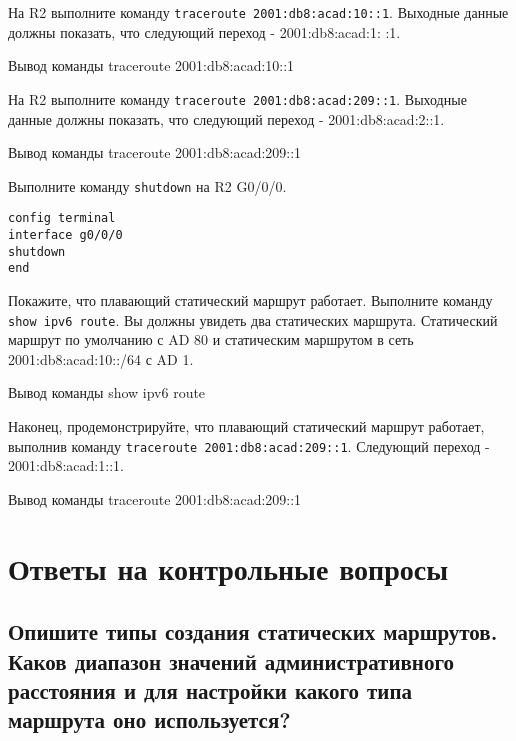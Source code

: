 На R2 выполните команду \texttt{traceroute 2001:db8:acad:10::1}.
Выходные данные должны показать, что следующий переход - 2001:db8:acad:1: :1.

\begin{image}
	\caption{Вывод команды traceroute 2001:db8:acad:10::1}
\end{image}

На R2 выполните команду \texttt{traceroute 2001:db8:acad:209::1}.
Выходные данные должны показать, что следующий переход - 2001:db8:acad:2::1.

\begin{image}
	\caption{Вывод команды traceroute 2001:db8:acad:209::1}
\end{image}

Выполните команду \texttt{shutdown} на R2 G0/0/0.

\begin{verbatim}
config terminal
interface g0/0/0
shutdown
end
\end{verbatim}

Покажите, что плавающий статический маршрут работает.
Выполните команду \texttt{show ipv6 route}.
Вы должны увидеть два статических маршрута.
Статический маршрут по умолчанию с AD 80
и статическим маршрутом в сеть 2001:db8:acad:10::/64 с AD 1.

\begin{image}
	\caption{Вывод команды show ipv6 route}
\end{image}

Наконец, продемонстрируйте, что плавающий статический маршрут работает,
выполнив команду \texttt{traceroute 2001:db8:acad:209::1}.
Следующий переход - 2001:db8:acad:1::1.

\begin{image}
	\caption{Вывод команды traceroute 2001:db8:acad:209::1}
\end{image}


\section{Ответы на контрольные вопросы}

\subsection{Опишите типы создания статических маршрутов.
	Каков диапазон значений административного расстояния
	и для настройки какого типа маршрута оно используется?}
	
